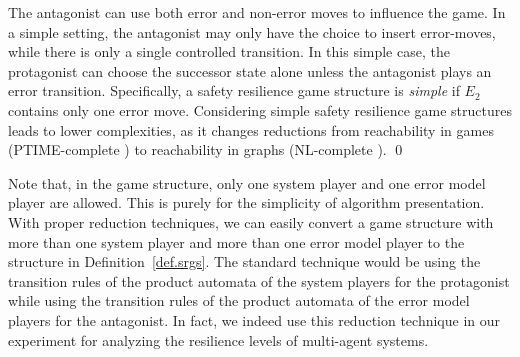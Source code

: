 \begin{definition}
The antagonist can use both error and non-error moves to influence the game.
In a simple setting, the antagonist may only have the choice to insert error-moves, while there is only a single controlled transition.
In this simple case, the protagonist can choose the successor state alone unless the antagonist plays an error transition.  
Specifically, a safety resilience game structure is {\em simple} if $E_2$ contains only one error move.
\label{reply1.2.complexities} 
Considering simple safety resilience game structures leads to lower 
complexities, as it changes reductions from reachability in games (PTIME-complete \cite{Immerman81})
to reachability in graphs (NL-complete \cite{Papadimitriou94}).
% 
\qed 
\end{definition} 

Note that, in the game structure, only one system player and one error model player 
are allowed.   
This is purely for the simplicity of algorithm presentation.  
With proper reduction techniques, we can easily convert 
a game structure with more than one system player and 
more than one error model player to the structure in Definition~\ref{def.srgs}.  
The standard technique would be using the transition rules of 
the product automata of the system players for the protagonist while 
using the transition rules of the product automata of the error model players 
for the antagonist.  
In fact, we indeed use this reduction technique in our experiment for 
analyzing the resilience levels of multi-agent systems.  

